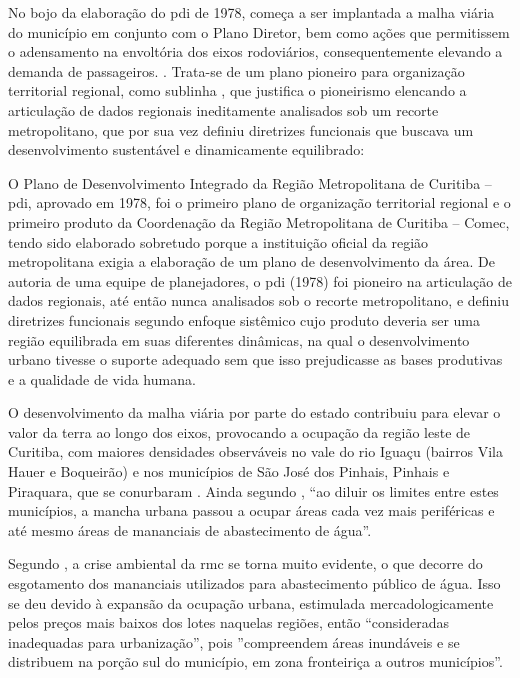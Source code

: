 	No bojo da elaboração do \gls{pdi} de 1978, começa a ser implantada a malha viária do município em conjunto com o Plano Diretor, bem como ações que permitissem o adensamento na envoltória dos eixos rodoviários, consequentemente elevando a demanda de passageiros. \cite[p. 53]{castro2005a}. Trata-se de um plano pioneiro para organização territorial regional, como sublinha , que justifica o pioneirismo elencando a articulação de dados regionais ineditamente analisados sob um recorte metropolitano, que por sua vez definiu diretrizes funcionais que buscava um desenvolvimento sustentável e dinamicamente equilibrado:
	
	\begin{citacao}
		O Plano de Desenvolvimento Integrado da Região Metropolitana de Curitiba – \gls{pdi}, aprovado em 1978, foi o primeiro plano de organização territorial regional e o primeiro produto da Coordenação da Região Metropolitana de Curitiba – Comec, tendo sido elaborado sobretudo porque a instituição oficial da região metropolitana exigia a elaboração de um plano de desenvolvimento da área. De autoria de uma equipe de planejadores, o \gls{pdi} (1978) foi pioneiro na articulação de dados regionais, até então nunca analisados sob o recorte metropolitano, e definiu diretrizes funcionais segundo enfoque sistêmico cujo produto deveria ser uma região equilibrada em suas diferentes dinâmicas, na qual o desenvolvimento urbano tivesse o suporte adequado sem que isso prejudicasse as bases produtivas e a qualidade de vida humana.
	\end{citacao}
	
	O desenvolvimento da malha viária por parte do estado contribuiu para elevar o valor da terra ao longo dos eixos, provocando a ocupação da região leste de Curitiba, com maiores densidades observáveis no vale do rio Iguaçu (bairros Vila Hauer e Boqueirão) e nos municípios de São José dos Pinhais, Pinhais e Piraquara, que se conurbaram \cite[p. 54]{castro2005a}. Ainda segundo , ``ao diluir os limites entre estes municípios, a mancha urbana passou a ocupar áreas cada vez mais periféricas e até mesmo áreas de mananciais de abastecimento de água''.
	
	Segundo , a crise ambiental da \gls{rmc} se torna muito evidente, o que decorre do esgotamento dos mananciais utilizados para abastecimento público de água. Isso se deu devido à expansão da ocupação urbana, estimulada mercadologicamente pelos preços mais baixos dos lotes naquelas regiões, então ``consideradas inadequadas para urbanização'', pois ''compreendem áreas inundáveis e se distribuem na porção sul do município, em zona fronteiriça a outros municípios''.
	
